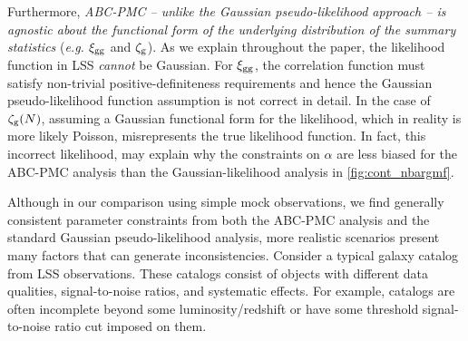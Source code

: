 Furthermore, {\em ABC-PMC -- unlike the Gaussian pseudo-likelihood approach -- 
is agnostic about the functional form of the underlying distribution of the 
summary statistics} (\emph{e.g.} $\xi_{\mathrm{gg}}$ and $\mathcal{\zeta}_{\rm g}$). As we explain throughout 
the paper, the likelihood function in LSS {\em cannot} be Gaussian. For $\xi_{\mathrm{gg}}$, 
the correlation function must satisfy non-trivial positive-definiteness requirements 
and hence the Gaussian pseudo-likelihood function assumption is not correct 
in detail. In the case of $\mathcal{\zeta}_{\rm g}(N)$, assuming a Gaussian functional form for 
the likelihood, which in reality is more likely Poisson, misrepresents the true 
likelihood function. In fact, this incorrect 
likelihood, may explain why the constraints on $\alpha$ are less biased for 
the ABC-PMC analysis than the Gaussian-likelihood analysis in \ref{fig:cont_nbargmf}.

Although in our comparison using simple mock observations, we find generally 
consistent parameter constraints from both the ABC-PMC analysis and the standard 
Gaussian pseudo-likelihood analysis, more realistic scenarios present many factors
that can generate inconsistencies. Consider a typical galaxy catalog from 
LSS observations. These catalogs consist of objects with different data 
qualities, signal-to-noise ratios, and systematic effects. For example, catalogs 
are often incomplete beyond some luminosity/redshift or have some threshold 
signal-to-noise ratio cut imposed on them.

